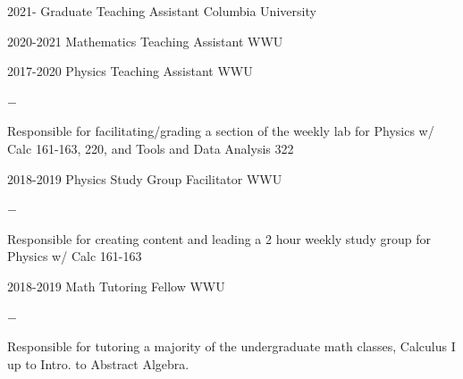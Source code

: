 \documentclass[]{scoggins-cv} %
\begin{document}
\begin{entrylist}


    \entry
    {2021-}
    {Graduate Teaching Assistant}
    {Columbia University}



    \entry
    {2020-2021}
    {Mathematics Teaching Assistant}
    {WWU}


    \entry
    {2017-2020}
    {Physics Teaching Assistant}
    {WWU}
    {%
        \vspace{-1em}
        \begin{list}{{\color{numcolor}$-$}}{\cvlist}
            \item Responsible for facilitating/grading a section of the weekly lab for Physics w/ Calc 161-163, 220, and Tools and Data Analysis 322
        \end{list}
    }


    \entry
    {2018-2019}
    {Physics Study Group Facilitator}
    {WWU}
    {%
        \vspace{-1em}
        \begin{list}{{\color{numcolor}$-$}}{\cvlist}
            \item Responsible for creating content and leading a 2 hour weekly study group for Physics w/ Calc 161-163
        \end{list}
    }


    \entry
    {2018-2019}
    {Math Tutoring Fellow}
    {WWU}
    {%
        \vspace{-1em}
        \begin{list}{{\color{numcolor}$-$}}{\cvlist}
            \item Responsible for tutoring a majority of the undergraduate math classes, Calculus I up to Intro. to Abstract Algebra.
        \end{list}
    }


\end{entrylist}

\end{document}
